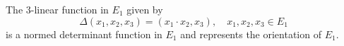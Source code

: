 The $3$-linear function in $E_1$ given by
$$\Delta(x_1, x_2, x_3) = (x_1 \cdot x_2, x_3), \quad x_1, x_2, x_3 \in E_1$$
is a normed determinant function in $E_1$ and represents the orientation of $E_1$.
